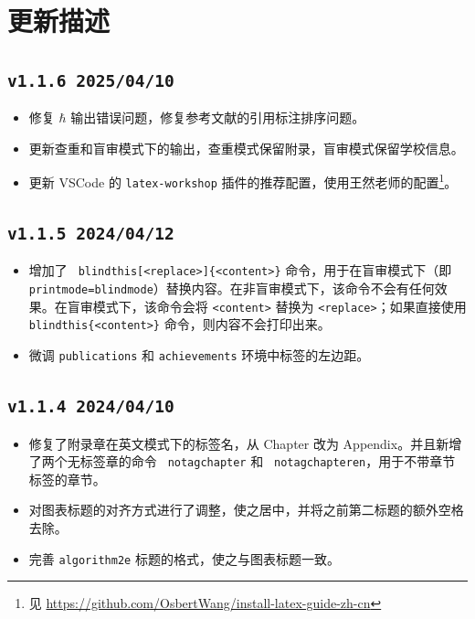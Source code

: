 \chapter{更新描述}

\section*{\texttt{v1.1.6 2025/04/10}}
\begin{itemize}
    \item 修复 $\hbar$ 输出错误问题，修复参考文献的引用标注排序问题。
    \item 更新查重和盲审模式下的输出，查重模式保留附录，盲审模式保留学校信息。
    \item 更新 VSCode 的 \texttt{latex-workshop} 插件的推荐配置，使用王然老师的配置\footnote{见 \url{https://github.com/OsbertWang/install-latex-guide-zh-cn}}。
\end{itemize}

\section*{\texttt{v1.1.5 2024/04/12}}
\begin{itemize}
    \item 增加了 \texttt{ blindthis[<replace>]\{<content>\}} 命令，用于在盲审模式下（即 \texttt{printmode=blindmode}）替换内容。在非盲审模式下，该命令不会有任何效果。在盲审模式下，该命令会将 \texttt{<content>} 替换为 \texttt{<replace>}；如果直接使用 \texttt{ blindthis\{<content>\}} 命令，则内容不会打印出来。
    \item 微调 \texttt{publications} 和 \texttt{achievements} 环境中标签的左边距。
\end{itemize}

\section*{\texttt{v1.1.4 2024/04/10}}
\begin{itemize}
    \item 修复了附录章在英文模式下的标签名，从 Chapter 改为 Appendix。并且新增了两个无标签章的命令 \texttt{ notagchapter} 和 \texttt{ notagchapteren}，用于不带章节标签的章节。
    \item 对图表标题的对齐方式进行了调整，使之居中，并将之前第二标题的额外空格去除。
    \item 完善 \texttt{algorithm2e} 标题的格式，使之与图表标题一致。
\end{itemize}

